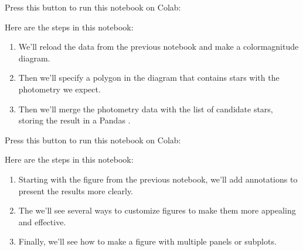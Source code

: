 \documentclass[letterpaper,10pt,english]{sphinxmanual}
\begin{document}
Press this button to run this notebook on Colab:




Here are the steps in this notebook:
\begin{enumerate}
%
\item {} 
We’ll reload the data from the previous notebook and make a color\sphinxhyphen{}magnitude diagram.

\item {} 
Then we’ll specify a polygon in the diagram that contains stars with the photometry we expect.

\item {} 
Then we’ll merge the photometry data with the list of candidate stars, storing the result in a Pandas .

\end{enumerate}

Press this button to run this notebook on Colab:




Here are the steps in this notebook:
\begin{enumerate}
%
\item {} 
Starting with the figure from the previous notebook, we’ll add annotations to present the results more clearly.

\item {} 
The we’ll see several ways to customize figures to make them more appealing and effective.

\item {} 
Finally, we’ll see how to make a figure with multiple panels or subplots.

\end{enumerate}
\end{document}
